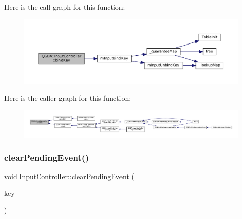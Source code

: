 Here is the call graph for this function\+:
\nopagebreak
\begin{figure}[H]
\begin{center}
\leavevmode
\includegraphics[width=350pt]{class_q_g_b_a_1_1_input_controller_ac603f8f09a8a04ed84dbec5dfcc3db56_cgraph}
\end{center}
\end{figure}
Here is the caller graph for this function\+:
\nopagebreak
\begin{figure}[H]
\begin{center}
\leavevmode
\includegraphics[width=350pt]{class_q_g_b_a_1_1_input_controller_ac603f8f09a8a04ed84dbec5dfcc3db56_icgraph}
\end{center}
\end{figure}
\mbox{\label{class_q_g_b_a_1_1_input_controller_a2fe06ce5ff99d006a7e774c1fbfde1c7}} 
\subsubsection{\texorpdfstring{clear\+Pending\+Event()}{clearPendingEvent()}}
{\footnotesize\ttfamily void Input\+Controller\+::clear\+Pending\+Event (\begin{DoxyParamCaption}\item[{G\+B\+A\+Key}]{key }\end{DoxyParamCaption})\hspace{0.3cm}{\ttfamily [private]}}

